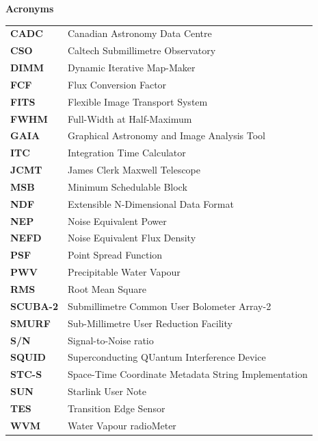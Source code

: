 \documentclass[twoside,11pt]{article}
\newenvironment{latexonly}{}{}
\renewcommand{\_}{\texttt{\symbol{95}}}
\begin{document}
\newpage
\begin{latexonly}
   \vspace{10mm}
   \begin{center}
      {\Large\textbf{Acronyms}}
   \end{center}

\setlength{\extrarowheight}{3pt}
\begin{table}[h!]
\begin{tabular}{ll}
\textbf{CADC}   & Canadian Astronomy Data Centre\\
\textbf{CSO}    & Caltech Submillimetre Observatory\\
\textbf{DIMM}   & Dynamic Iterative Map-Maker\\
\textbf{FCF}    & Flux Conversion Factor\\
\textbf{FITS}   & Flexible Image Transport System\\
\textbf{FWHM}   & Full-Width at Half-Maximum\\
\textbf{GAIA}   & Graphical Astronomy and Image Analysis Tool\\
\textbf{ITC}    & Integration Time Calculator\\
\textbf{JCMT}   & James Clerk Maxwell Telescope\\
\textbf{MSB}    & Minimum Schedulable Block\\
\textbf{NDF}    & Extensible N-Dimensional Data Format\\
\textbf{NEP}    & Noise Equivalent Power\\
\textbf{NEFD}   & Noise Equivalent Flux Density\\
\textbf{PSF}    & Point Spread Function\\
\textbf{PWV}    & Precipitable Water Vapour\\
\textbf{RMS}    & Root Mean Square\\
\textbf{SCUBA-2}& Submillimetre Common User Bolometer Array-2\\
\textbf{SMURF}  & Sub-Millimetre User Reduction Facility\\
\textbf{S/N}    & Signal-to-Noise ratio\\
\textbf{SQUID}  & Superconducting QUantum Interference Device\\
\textbf{STC-S}  & Space-Time Coordinate Metadata String Implementation\\
\textbf{SUN}    & Starlink User Note\\
\textbf{TES}    & Transition Edge Sensor\\
\textbf{WVM}    & Water Vapour radioMeter\\
\end{tabular}
\end{table}

\end{latexonly}
\end{document}
